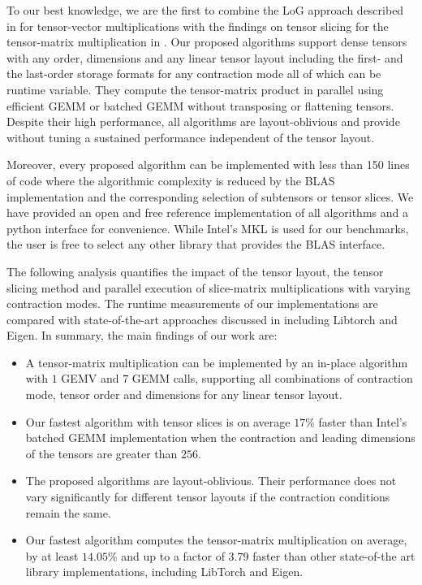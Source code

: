 To our best knowledge, we are the first to combine the LoG approach described in \cite{bassoy:2019:ttv, pawlowski:2019:morton.tensor.computations} for tensor-vector multiplications with the findings on tensor slicing for the tensor-matrix multiplication in \cite{li:2015:input}.
Our proposed algorithms support dense tensors with any order, dimensions and any linear tensor layout including the first- and the last-order storage formats for any contraction mode all of which can be runtime variable.
They compute the tensor-matrix product in parallel using efficient GEMM or batched GEMM without transposing or flattening tensors.
Despite their high performance, all algorithms are layout-oblivious and provide without tuning a sustained performance independent of the tensor layout.

Moreover, every proposed algorithm can be implemented with less than 150 lines of  code where the algorithmic complexity is reduced by the BLAS implementation and the corresponding selection of subtensors or tensor slices.
We have provided an open and free reference  implementation of all algorithms and a python interface for convenience.
While Intel's MKL is used for our benchmarks, the user is free to select any other library that provides the BLAS interface.

The following analysis quantifies the impact of the tensor layout, the tensor slicing method and parallel execution of slice-matrix multiplications with varying contraction modes.
The runtime measurements of our implementations are compared with state-of-the-art approaches discussed in \cite{springer:2018:design, matthews:2018:high, paszke:2019:pytorch} including Libtorch and Eigen. In summary, the main findings of our work are:
\begin{itemize}
	\item 
	A tensor-matrix multiplication can be implemented by an in-place algorithm with $1$ GEMV and $7$ GEMM calls, supporting all combinations of contraction mode, tensor order and dimensions for any linear tensor layout.
	\item 
	Our fastest algorithm with tensor slices is on average $17$\% faster than Intel's batched GEMM implementation when the contraction and leading dimensions of the tensors are greater than $256$.
	\item 
	The proposed algorithms are layout-oblivious. 
	Their performance does not vary significantly for different tensor layouts if the contraction conditions remain the same.
	\item
	Our fastest algorithm computes the tensor-matrix multiplication on average, by at least $14.05$\% and up to a factor of $3.79$ faster than other state-of-the art library implementations, including LibTorch and Eigen.
\end{itemize}

